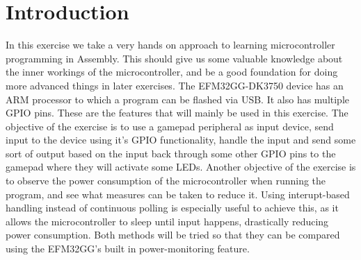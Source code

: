 \chapter{Introduction}
In this exercise we take a very hands on approach to learning microcontroller programming in Assembly. This should give us some valuable knowledge about the inner workings of the microcontroller, and be a good foundation for doing more advanced things in later exercises.
The EFM32GG-DK3750 device has an ARM processor to which a program can be flashed via USB. It also has multiple GPIO pins. These are the features that will mainly be used in this exercise.
The objective of the exercise is to use a gamepad peripheral as input device, send input to the device using it's GPIO functionality, handle the input and send some sort of output based on the input back through some other GPIO pins to the gamepad where they will activate some LEDs.
Another objective of the exercise is to observe the power consumption of the microcontroller when running the program, and see what measures can be taken to reduce it. Using interupt-based handling instead of continuous polling is especially useful to achieve this, as it allows the microcontroller to sleep until input happens, drastically reducing power consumption. Both methods will be tried so that they can be compared using the EFM32GG's built in power-monitoring feature.
